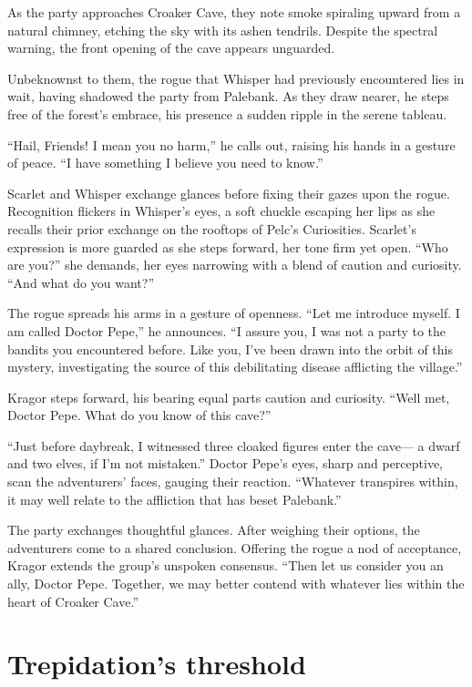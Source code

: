 \documentclass[
  letterpaper,12pt,twoside,twocolumn,openany,
  nodeprecatedcode,bg=full]{dndbook}
\begin{document}
As the party approaches Croaker Cave, they note smoke spiraling upward
from a natural chimney, etching the sky with its ashen tendrils. Despite
the spectral warning, the front opening of the cave appears unguarded.

Unbeknownst to them, the rogue that Whisper had previously encountered
lies in wait, having shadowed the party from Palebank. As they draw
nearer, he steps free of the forest's embrace, his presence a sudden
ripple in the serene tableau.

``Hail, Friends! I mean you no harm,'' he calls out, raising his hands
in a gesture of peace. ``I have something I believe you need to know.''

Scarlet and Whisper exchange glances before fixing their gazes upon the
rogue. Recognition flickers in Whisper's eyes, a soft chuckle escaping
her lips as she recalls their prior exchange on the rooftops of Pelc's
Curiosities. Scarlet's expression is more guarded as she steps forward,
her tone firm yet open. ``Who are you?'' she demands, her eyes narrowing
with a blend of caution and curiosity. ``And what do you want?''

The rogue spreads his arms in a gesture of openness. ``Let me introduce
myself. I am called Doctor Pepe,'' he announces. ``I assure you, I was
not a party to the bandits you encountered before. Like you, I've been
drawn into the orbit of this mystery, investigating the source of this
debilitating disease afflicting the village.''

Kragor steps forward, his bearing equal parts caution and curiosity.
``Well met, Doctor Pepe. What do you know of this cave?''

``Just before daybreak, I witnessed three cloaked figures enter the
cave--- a dwarf and two elves, if I'm not mistaken.'' Doctor Pepe's
eyes, sharp and perceptive, scan the adventurers' faces, gauging their
reaction. ``Whatever transpires within, it may well relate to the
affliction that has beset Palebank.''

The party exchanges thoughtful glances. After weighing their options,
the adventurers come to a shared conclusion. Offering the rogue a nod of
acceptance, Kragor extends the group's unspoken consensus. ``Then let us
consider you an ally, Doctor Pepe. Together, we may better contend with
whatever lies within the heart of Croaker Cave.''

\section{Trepidation's threshold}\label{trepidations-threshold}
\end{document}
